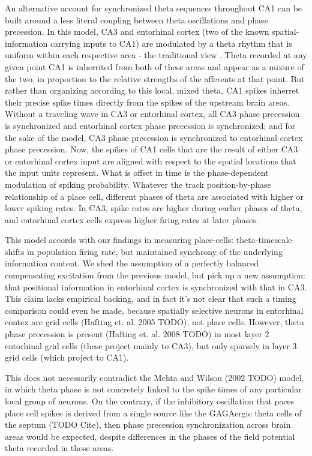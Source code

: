 \documentclass[10pt]{article}
\begin{document}
An alternative account for synchronized theta sequences throughout CA1 can be built around a less literal coupling between theta oscillations and phase precession. In this model, CA3 and entorhinal cortex (two of the known spatial-information carrying inputs to CA1) are modulated by a theta rhythm that is uniform within each respective area - the traditional view \cite{Mizuseki 2012}. Theta recorded at any given point CA1 is inherrited from both of these areas and appear as a mixure of the two, in proportion to the relative strengths of the afferents at that point. But rather than organizing according to this local, mixed theta, CA1 spikes inherret their precise spike times directly from the spikes of the upstream brain areas. Without a traveling wave in CA3 or entorhinal cortex, all CA3 phase precession is synchronized and entorhinal cortex phase precession is synchronized; and for the sake of the model, CA3 phase precession is synchronized to entorhinal cortex phase precession. Now, the spikes of CA1 cells that are the result of either CA3 or entorhinal cortex input are aligned with respect to the spatial locations that the input units represent. What is offset in time is the phase-dependent modulation of spiking probability. Whatever the track position-by-phase relationship of a place cell, different phases of theta are associated with higher or lower spiking rates. In CA3, spike rates are higher during earlier phases of theta, and entorhinal cortex cells express higher firing rates at later phases.

This model accords with our findings in measuring place-cells: theta-timescale shifts in population firing rate, but maintained synchrony of the underlying information content. We shed the assumption of a perfectly balanced compensating excitation from the previous model, but pick up a new assumption: that positional information in entorhinal cortex is synchronized with that in CA3. This claim lacks empirical backing, and in fact it's not clear that such a timing comparison could even be made, because spatially selective neurons in entorhinal contex are grid cells (Hafting et. al. 2005 TODO), not place cells. However, theta phase precession is present (Hafting et. al. 2008 TODO) in most layer 2 entorhinal grid cells (these project mainly to CA3), but only sparsely in layer 3 grid cells (which project to CA1). 

This does not necessarily contradict the Mehta and Wilson (2002 TODO) model, in which theta phase is not concretely linked to the spike times of any particular local group of neurons. On the contrary, if the inhibitory oscillation that paces place cell spikes is derived from a single source like the GAGAergic theta cells of the septum (TODO Cite), then phase precession synchronization across brain areas would be expected, despite differences in the phases of the field potential theta recorded in those areas. 
\end{document}
